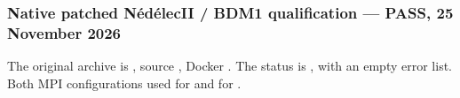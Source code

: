 \documentclass[letterpaper,10pt,english]{sphinxmanual}
\begin{document}
\subsubsection{Native patched Nédélec\sphinxhyphen{}II / BDM1 qualification — PASS, 25 November 2026}
\label{\detokenize{examples/maxwell_3d:native-patched-nedelec-ii-bdm1-qualification-pass-25-november-2026}}
\sphinxAtStartPar
{}
The original archive is
,
source
,
Docker .
The  status is
,
with an empty error list.
Both MPI configurations used 
 for 
and  for .
\end{document}
